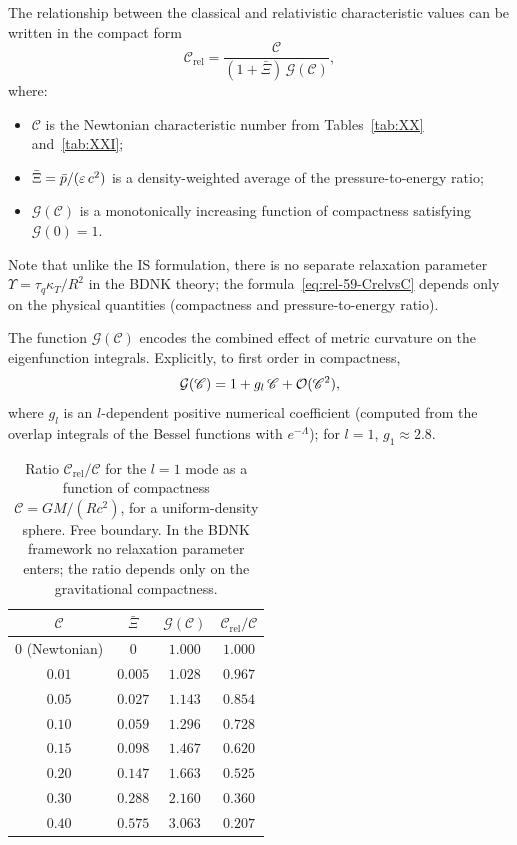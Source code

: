 The relationship between the classical and relativistic
characteristic values can be written in the compact form
\begin{equation}
\label{eq:rel-59-CrelvsC}
\mathcal{C}_{\mathrm{rel}}
  = \frac{\mathcal{C}}{
    (1+\bar{\Xi})\,\mathcal{G}(\mathscr{C})},
\end{equation}
where:
\begin{itemize}
\item $\mathcal{C}$ is the Newtonian characteristic number from
  Tables~\ref{tab:XX} and~\ref{tab:XXI};
\item $\bar{\Xi} = \bar{p}/(\varepsilon\,c^{2})$ is a
  density-weighted average of the pressure-to-energy ratio;
\item $\mathcal{G}(\mathscr{C})$ is a monotonically increasing
  function of compactness satisfying $\mathcal{G}(0)=1$.
\end{itemize}
Note that unlike the IS formulation, there is no separate
relaxation parameter $\Upsilon = \tau_{q}\kappa_{T}/R^{2}$ in the
BDNK theory; the formula~\eqref{eq:rel-59-CrelvsC} depends only on
the physical quantities (compactness and pressure-to-energy ratio).

The function $\mathcal{G}(\mathscr{C})$ encodes the combined effect
of metric curvature on the eigenfunction integrals.  Explicitly, to
first order in compactness,
\begin{equation}
\label{eq:rel-59-Gexpand}
\mathcal{G}(\mathscr{C})
  = 1 + g_{l}\,\mathscr{C} + \mathcal{O}(\mathscr{C}^{2}),
\end{equation}
where $g_{l}$ is an $l$-dependent positive numerical coefficient
(computed from the overlap integrals of the Bessel functions with
$e^{-\Lambda}$); for $l=1$, $g_{1}\approx 2.8$.

\begin{table}[ht]
\centering
\caption{Ratio $\mathcal{C}_{\mathrm{rel}}/\mathcal{C}$ for the
$l=1$ mode as a function of compactness $\mathscr{C}=GM/(Rc^{2})$,
for a uniform-density sphere.  Free boundary.  In the BDNK
framework no relaxation parameter enters; the ratio depends only on
the gravitational compactness.}
\label{tab:rel-59-comparison}
\begin{tabular}{c c c c}
\hline
$\mathscr{C}$ & $\bar{\Xi}$ & $\mathcal{G}(\mathscr{C})$ &
  $\mathcal{C}_{\mathrm{rel}}/\mathcal{C}$ \\
\hline
$0$ (Newtonian) & $0$ & $1.000$ & $1.000$ \\
$0.01$ & $0.005$ & $1.028$ & $0.967$ \\
$0.05$ & $0.027$ & $1.143$ & $0.854$ \\
$0.10$ & $0.059$ & $1.296$ & $0.728$ \\
$0.15$ & $0.098$ & $1.467$ & $0.620$ \\
$0.20$ & $0.147$ & $1.663$ & $0.525$ \\
$0.30$ & $0.288$ & $2.160$ & $0.360$ \\
$0.40$ & $0.575$ & $3.063$ & $0.207$ \\
\hline
\end{tabular}
\end{table}

